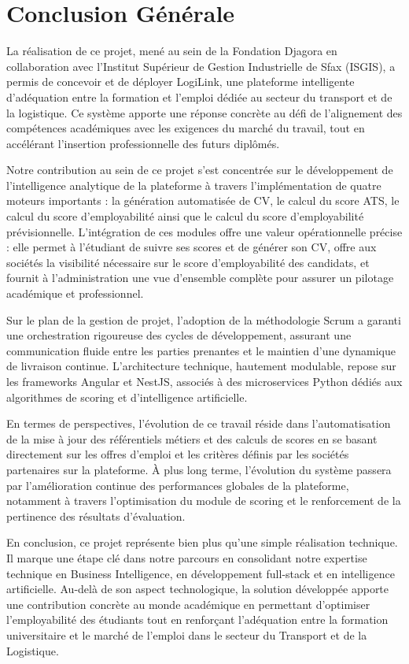 \chapter*{Conclusion Générale}

La réalisation de ce projet, mené au sein de la Fondation Djagora en collaboration avec l'Institut Supérieur de Gestion Industrielle de Sfax (ISGIS), a permis de concevoir et de déployer LogiLink, une plateforme intelligente d'adéquation entre la formation et l'emploi dédiée au secteur du transport et de la logistique. Ce système apporte une réponse concrète au défi de l'alignement des compétences académiques avec les exigences du marché du travail, tout en accélérant l'insertion professionnelle des futurs diplômés.

\noindent Notre contribution au sein de ce projet s'est concentrée sur le développement de l'intelligence analytique de la plateforme à travers l'implémentation de quatre moteurs importants : la génération automatisée de CV, le calcul du score ATS, le calcul du score d'employabilité ainsi que le calcul du score d'employabilité prévisionnelle. L'intégration de ces modules offre une valeur opérationnelle précise : elle permet à l'étudiant de suivre ses scores et de générer son CV, offre aux sociétés la visibilité nécessaire sur le score d'employabilité des candidats, et fournit à l'administration une vue d'ensemble complète pour assurer un pilotage académique et professionnel.

\noindent Sur le plan de la gestion de projet, l'adoption de la méthodologie Scrum a garanti une orchestration rigoureuse des cycles de développement, assurant une communication fluide entre les parties prenantes et le maintien d'une dynamique de livraison continue. L'architecture technique, hautement modulable, repose sur les frameworks Angular et NestJS, associés à des microservices Python dédiés aux algorithmes de scoring et d'intelligence artificielle.

\noindent En termes de perspectives, l'évolution de ce travail réside dans l'automatisation de la mise à jour des référentiels métiers et des calculs de scores en se basant directement sur les offres d'emploi et les critères définis par les sociétés partenaires sur la plateforme. À plus long terme, l'évolution du système passera par l'amélioration continue des performances globales de la plateforme, notamment à travers l'optimisation du module de scoring et le renforcement de la pertinence des résultats d'évaluation.

\noindent En conclusion, ce projet représente bien plus qu'une simple réalisation technique. Il marque une étape clé dans notre parcours en consolidant notre expertise technique en Business Intelligence, en développement full-stack et en intelligence artificielle. Au-delà de son aspect technologique, la solution développée apporte une contribution concrète au monde académique en permettant d'optimiser l'employabilité des étudiants tout en renforçant l'adéquation entre la formation universitaire et le marché de l'emploi dans le secteur du Transport et de la Logistique. 
\newpage
